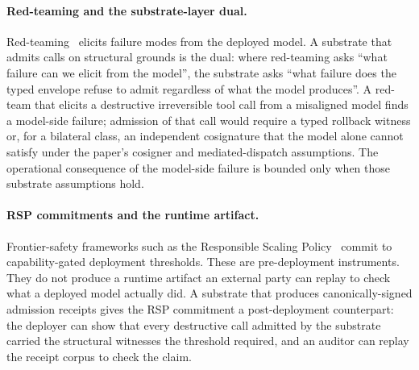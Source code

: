 \paragraph{Red-teaming and the substrate-layer dual.}
Red-teaming~\cite{perezRedTeaming2022} elicits failure modes from the deployed model. A substrate that admits calls on structural grounds is the dual: where red-teaming asks ``what failure can we elicit from the model'', the substrate asks ``what failure does the typed envelope refuse to admit regardless of what the model produces''. A red-team that elicits a destructive irreversible tool call from a misaligned model finds a model-side failure; admission of that call would require a typed rollback witness or, for a bilateral class, an independent cosignature that the model alone cannot satisfy under the paper's cosigner and mediated-dispatch assumptions. The operational consequence of the model-side failure is bounded only when those substrate assumptions hold.

\paragraph{RSP commitments and the runtime artifact.}
Frontier-safety frameworks such as the Responsible Scaling Policy~\cite{anthropicRSP2023} commit to capability-gated deployment thresholds. These are pre-deployment instruments. They do not produce a runtime artifact an external party can replay to check what a deployed model actually did. A substrate that produces canonically-signed admission receipts gives the RSP commitment a post-deployment counterpart: the deployer can show that every destructive call admitted by the substrate carried the structural witnesses the threshold required, and an auditor can replay the receipt corpus to check the claim.

